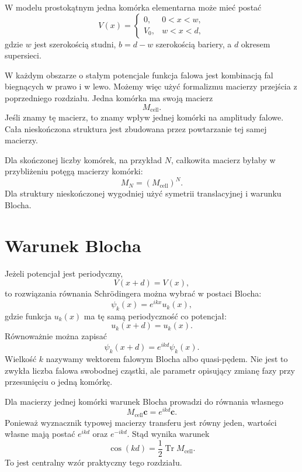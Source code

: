 W modelu prostokątnym jedna komórka elementarna może mieć postać
\[
V(x)=
\begin{cases}
0, & 0<x<w,\\
V_0, & w<x<d,
\end{cases}
\]
gdzie \(w\) jest szerokością studni, \(b=d-w\) szerokością bariery, a \(d\) okresem supersieci.

W każdym obszarze o stałym potencjale funkcja falowa jest kombinacją fal biegnących w prawo i w lewo. Możemy więc użyć formalizmu macierzy przejścia z poprzedniego rozdziału. Jedna komórka ma swoją macierz
\begin{equation}
    M_{\mathrm{cell}}.
\end{equation}
Jeśli znamy tę macierz, to znamy wpływ jednej komórki na amplitudy falowe. Cała nieskończona struktura jest zbudowana przez powtarzanie tej samej macierzy.

Dla skończonej liczby komórek, na przykład \(N\), całkowita macierz byłaby w przybliżeniu potęgą macierzy komórki:
\begin{equation}
    M_N=(M_{\mathrm{cell}})^N.
\end{equation}
Dla struktury nieskończonej wygodniej użyć symetrii translacyjnej i warunku Blocha.

\section{Warunek Blocha}

Jeżeli potencjał jest periodyczny,
\[
    V(x+d)=V(x),
\]
to rozwiązania równania Schrödingera można wybrać w postaci Blocha:
\begin{equation}
    \psi_k(x)=e^{ikx}u_k(x),
\end{equation}
gdzie funkcja \(u_k(x)\) ma tę samą periodyczność co potencjał:
\begin{equation}
    u_k(x+d)=u_k(x).
\end{equation}
Równoważnie można zapisać
\begin{equation}
    \psi_k(x+d)=e^{ikd}\psi_k(x).
\end{equation}
Wielkość \(k\) nazywamy wektorem falowym Blocha albo quasi-pędem. Nie jest to zwykła liczba falowa swobodnej cząstki, ale parametr opisujący zmianę fazy przy przesunięciu o jedną komórkę.

Dla macierzy jednej komórki warunek Blocha prowadzi do równania własnego
\begin{equation}
    M_{\mathrm{cell}}\mathbf{c}=e^{ikd}\mathbf{c}.
\end{equation}
Ponieważ wyznacznik typowej macierzy transferu jest równy jeden, wartości własne mają postać \(e^{ikd}\) oraz \(e^{-ikd}\). Stąd wynika warunek
\begin{equation}
    \cos(kd)=\frac{1}{2}\operatorname{Tr}M_{\mathrm{cell}}.
\end{equation}
To jest centralny wzór praktyczny tego rozdziału.

